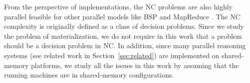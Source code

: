 From the perspective of implementations, the NC problems are also highly
parallel feasible for other parallel models like BSP \cite{Valiant90}
and MapReduce \cite{KarloffSV10}. The NC complexity is originally defined
as a class of decision problems. Since we study the problem of materialization, we do not
require in this work that a problem should be a decision problem in NC.
In addition, since many parallel reasoning systems (see related work in Section~\ref{sec:related})
are implemented on shared-memory platforms, we
study all the issues in this work by assuming that the running machines are in
shared-memory configurations.



